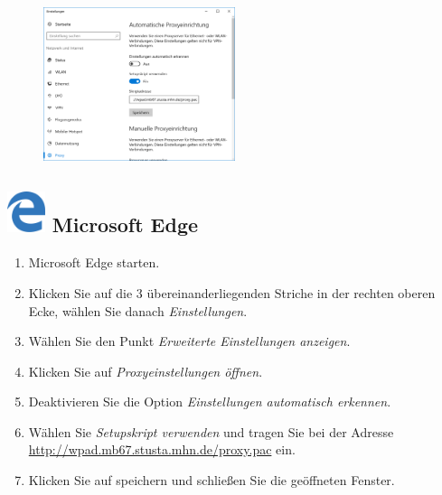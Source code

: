 \documentclass[a4paper,12pt]{scrartcl}
\begin{document}
\newpage
\begin{figure}
	\begin{center}
		\includegraphics[width=0.5\textwidth,keepaspectratio]{Bilder/Proxy_Edge_mb}
	\end{center}
\end{figure}

\subsection*{\includegraphics[height=1.2cm,keepaspectratio]{Bilder/Mcrosoft_Edge_logo} Microsoft Edge}
\begin{enumerate}
	\item Microsoft Edge starten.
	\item Klicken Sie auf die 3 übereinanderliegenden Striche in der rechten oberen Ecke, wählen Sie danach \emph{Einstellungen}.
	\item Wählen Sie den Punkt \emph{Erweiterte Einstellungen anzeigen}.
	\item Klicken Sie auf \emph{Proxyeinstellungen öffnen}.
	\item Deaktivieren Sie die Option \emph{Einstellungen automatisch erkennen}.
	\item Wählen Sie \emph{Setupskript verwenden} und tragen Sie bei der Adresse \\ \url{http://wpad.mb67.stusta.mhn.de/proxy.pac} ein.
	\item Klicken Sie auf speichern und schließen Sie die geöffneten Fenster.
\end{enumerate}
\end{document}
